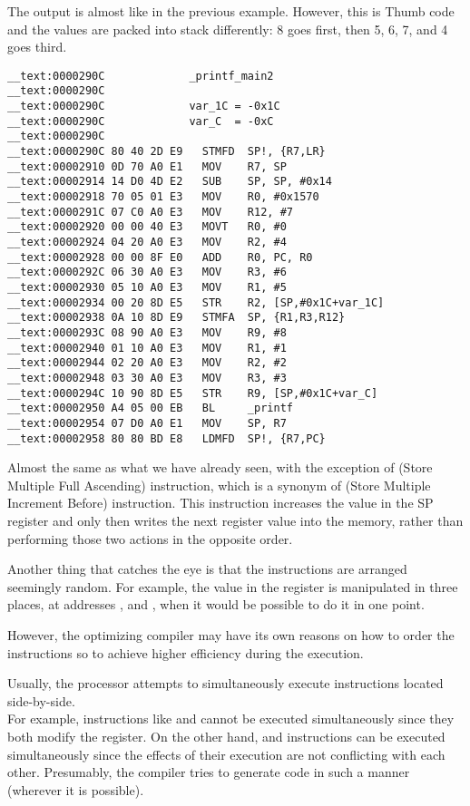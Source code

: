 The output is almost like in the previous example. However, this is Thumb code and the values are packed into stack differently: 
8 goes first, then 5, 6, 7, and 4 goes third.

\myparagraph{\OptimizingXcodeIV: \ARMMode}

\begin{lstlisting}
__text:0000290C             _printf_main2
__text:0000290C
__text:0000290C             var_1C = -0x1C
__text:0000290C             var_C  = -0xC
__text:0000290C
__text:0000290C 80 40 2D E9   STMFD  SP!, {R7,LR}
__text:00002910 0D 70 A0 E1   MOV    R7, SP
__text:00002914 14 D0 4D E2   SUB    SP, SP, #0x14
__text:00002918 70 05 01 E3   MOV    R0, #0x1570
__text:0000291C 07 C0 A0 E3   MOV    R12, #7
__text:00002920 00 00 40 E3   MOVT   R0, #0
__text:00002924 04 20 A0 E3   MOV    R2, #4
__text:00002928 00 00 8F E0   ADD    R0, PC, R0
__text:0000292C 06 30 A0 E3   MOV    R3, #6
__text:00002930 05 10 A0 E3   MOV    R1, #5
__text:00002934 00 20 8D E5   STR    R2, [SP,#0x1C+var_1C]
__text:00002938 0A 10 8D E9   STMFA  SP, {R1,R3,R12}
__text:0000293C 08 90 A0 E3   MOV    R9, #8
__text:00002940 01 10 A0 E3   MOV    R1, #1
__text:00002944 02 20 A0 E3   MOV    R2, #2
__text:00002948 03 30 A0 E3   MOV    R3, #3
__text:0000294C 10 90 8D E5   STR    R9, [SP,#0x1C+var_C]
__text:00002950 A4 05 00 EB   BL     _printf
__text:00002954 07 D0 A0 E1   MOV    SP, R7
__text:00002958 80 80 BD E8   LDMFD  SP!, {R7,PC}
\end{lstlisting}

Almost the same as what we have already seen, with the
exception of  (Store Multiple Full Ascending) instruction, which is a synonym of  (Store Multiple Increment Before) instruction. 
This instruction increases the value in the \ac{SP} register and only then writes the next register value into the memory, rather than performing those two actions in the opposite order.

Another thing that catches the eye is that the instructions are arranged seemingly random.
For example, the value in the  register is manipulated in three
places, at addresses ,  and , when it would be possible to do it in one point.

However, the optimizing compiler may have its own reasons on how to order the instructions so to achieve higher efficiency during the execution.

Usually, the processor attempts to simultaneously execute instructions located side-by-side.\\
For example, instructions like  and
 cannot be executed simultaneously since they both modify the  register. 
On the other hand,  and  
instructions can be executed
simultaneously since the effects of their execution are not conflicting with each other.
Presumably, the compiler tries to generate code in such a manner (wherever it is possible).
 
